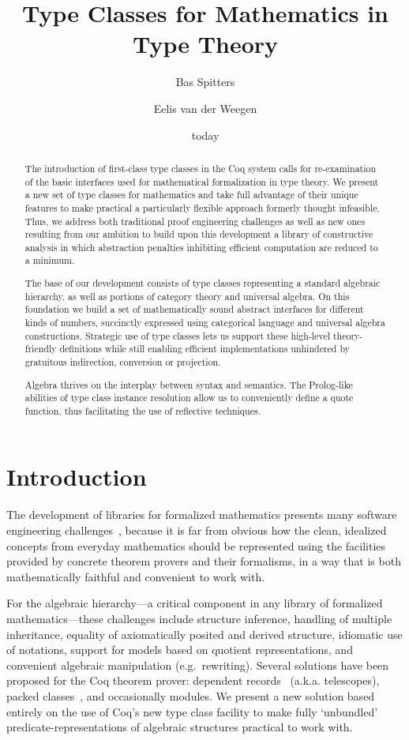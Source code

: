 \documentclass[a4paper,10pt,runningheads]{llncs}
\begin{document}
\title{Type Classes for Mathematics in Type Theory}
\author{Bas Spitters \and Eelis van der Weegen} 
\date{today}
\maketitle
\begin{abstract}
The introduction of first-class type classes in the Coq system calls for re-examination of the basic interfaces used for mathematical formalization in type theory.
We present a new set of type classes for mathematics and take full advantage of their unique features to make practical a particularly flexible approach formerly thought infeasible. Thus, we address both traditional proof engineering challenges as well as new ones resulting from our ambition to build upon this development a library of constructive analysis in which abstraction penalties inhibiting efficient computation are reduced to a minimum.

The base of our development consists of type classes representing a standard algebraic hierarchy, as well as portions of category theory and universal algebra. On this foundation we build a set of mathematically sound abstract interfaces for different kinds of numbers, succinctly expressed using categorical language and universal algebra constructions. Strategic use of type classes lets us support these high-level theory-friendly definitions while still enabling efficient implementations unhindered by gratuitous indirection, conversion or projection.

Algebra thrives on the interplay between syntax and semantics. The Prolog-like abilities of type class instance resolution allow us to conveniently define a quote function, thus facilitating the use of reflective techniques.
\end{abstract}

\section{Introduction}
The development of libraries for formalized mathematics presents many software engineering challenges~\cite{C-corn,DBLP:conf/types/HaftmannW08}, because it is far from obvious how the clean, idealized concepts from everyday mathematics should be represented using the facilities provided by concrete theorem provers and their formalisms, in a way that is both mathematically faithful and convenient to work with.

For the algebraic hierarchy---a critical component in any library of formalized mathematics---these challenges include structure inference, handling of multiple inheritance, equality of axiomatically posited and derived structure, idiomatic use of notations, support for models based on quotient representations, and convenient algebraic manipulation (e.g.\ rewriting). Several solutions have been proposed for the Coq theorem prover: dependent records~\cite{DBLP:journals/jsc/GeuversPWZ02} (a.k.a. telescopes), packed classes~\cite{Packed}, and occasionally modules. We present a new solution based entirely on the use of Coq's new type class facility to make fully `unbundled' predicate-representations of algebraic structures practical to work with.
\end{document}
